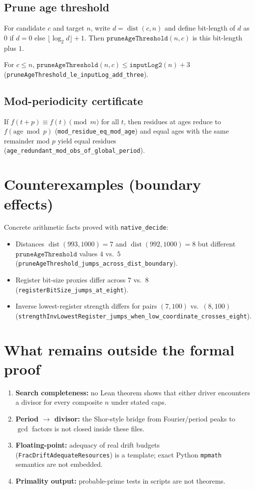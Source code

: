 \documentclass[11pt,a4paper]{article}
\newcommand{\dist}{\operatorname{dist}}
\theoremstyle{plain}
\theoremstyle{definition}
\theoremstyle{remark}
\begin{document}
\subsection{Prune age threshold}

For candidate $c$ and target $n$, write $d=\dist(c,n)$ and define bit-length of $d$ as
$0$ if $d=0$ else $\lfloor\log_2 d\rfloor+1$. Then
$\texttt{pruneAgeThreshold}(n,c)$ is this bit-length plus $1$.

For $c\le n$, $\texttt{pruneAgeThreshold}(n,c) \le \texttt{inputLog2}(n)+3$
(\texttt{pruneAgeThreshold\_le\_inputLog\_add\_three}).

\subsection{Mod-periodicity certificate}

If $f(t+p)\equiv f(t) \pmod m$ for all $t$, then residues at ages reduce to
$f(\mathrm{age}\bmod p)$ (\texttt{mod\_residue\_eq\_mod\_age}) and equal ages with the
same remainder mod $p$ yield equal residues (\texttt{age\_redundant\_mod\_obs\_of\_global\_period}).

\section{Counterexamples (boundary effects)}

Concrete arithmetic facts proved with \texttt{native\_decide}:
\begin{itemize}
\item Distances $\dist(993,1000)=7$ and $\dist(992,1000)=8$ but different
      $\texttt{pruneAgeThreshold}$ values $4$ vs.\ $5$
      (\texttt{pruneAgeThreshold\_jumps\_across\_dist\_boundary}).
\item Register bit-size proxies differ across $7$ vs.\ $8$
      (\texttt{registerBitSize\_jumps\_at\_eight}).
\item Inverse lowest-register strength differs for pairs $(7,100)$ vs.\ $(8,100)$
      (\texttt{strengthInvLowestRegister\_jumps\_when\_low\_coordinate\_crosses\_eight}).
\end{itemize}

\section{What remains outside the formal proof}

\begin{enumerate}[label=\textbf{G\arabic*.}]
\item \textbf{Search completeness:} no Lean theorem shows that either driver
      encounters a divisor for every composite $n$ under stated caps.
\item \textbf{Period $\to$ divisor:} the Shor-style bridge from Fourier/period peaks
      to $\gcd$ factors is not closed inside these files.
\item \textbf{Floating-point:} adequacy of real drift budgets (\texttt{FracDriftAdequateResources})
      is a template; exact Python \texttt{mpmath} semantics are not embedded.
\item \textbf{Primality output:} probable-prime tests in scripts are not theorems.
\end{enumerate}
\end{document}
